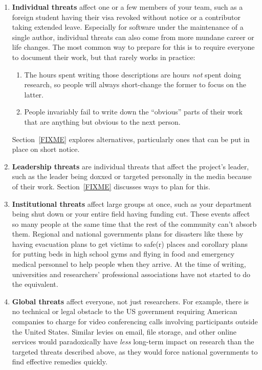 \documentclass[10pt,letterpaper]{article}
\begin{document}
\begin{enumerate}
\item
  \textbf{Individual threats} affect one or a few members of your team,
  such as a foreign student having their visa revoked without notice
  or a contributor taking extended leave.
  Especially for software under the maintenance of a single author,
  individual threats can also come from more mundane career or life changes.
  The most common way to prepare for this is to require everyone to document their work,
  but that rarely works in practice:
  \begin{enumerate}
  \item
    The hours spent writing those descriptions are hours \emph{not} spent doing research,
    so people will always short-change the former to focus on the latter.
  \item
    People invariably fail to write down the ``obvious'' parts of their work
    that are anything but obvious to the next person.
  \end{enumerate}
  Section~\ref{FIXME} explores alternatives,
  particularly ones that can be put in place on short notice.

\item
  \textbf{Leadership threats} are individual threats that affect the project's leader,
  such as the leader being doxxed or targeted personally in the media because of their work.
  Section~\ref{FIXME} discusses ways to plan for this.

\item
  \textbf{Institutional threats} affect large groups at once,
  such as your department being shut down
  or your entire field having funding cut.
  These events affect so many people at the same time
  that the rest of the community can't absorb them.
  Regional and national governments plans for disasters like these
  by having evacuation plans to get victims to safe(r) places
  and corollary plans for putting beds in high school gyms
  and flying in food and emergency medical personnel to help people when they arrive.
  At the time of writing,
  universities and researchers' professional associations have not started to do the equivalent.

\item
  \textbf{Global threats} affect everyone,
  not just researchers.
  For example,
  there is no technical or legal obstacle to the US government
  requiring American companies to charge for video conferencing calls
  involving participants outside the United States.
  Similar levies on email,
  file storage,
  and other online services would paradoxically have \emph{less} long-term impact on research
  than the targeted threats described above,
  as they would force national governments to find effective remedies quickly.

\end{enumerate}
\end{document}
